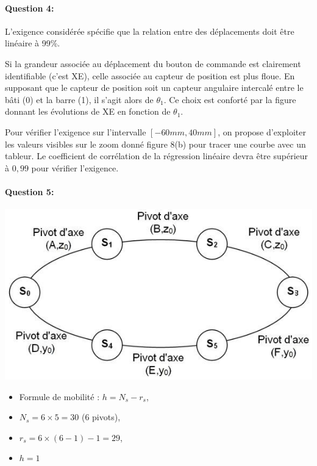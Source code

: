 \paragraph{Question 4:} L'exigence considérée spécifie que la relation entre des déplacements doit être linéaire à 99\%.

Si la grandeur associée au déplacement du bouton de commande est clairement identifiable (c'est XE), celle associée au capteur de position est plus floue. En supposant que le capteur de position soit un capteur angulaire intercalé entre le bâti (0) et la barre (1), il s'agit alors de $\theta_1$. Ce choix est conforté par la figure donnant les évolutions de XE en fonction de $\theta_1$.

Pour vérifier l'exigence sur l'intervalle $[-60 mm, 40 mm]$, on propose d'exploiter les valeurs visibles sur le zoom donné figure 8(b) pour tracer une courbe avec un tableur. Le coefficient de corrélation de la régression linéaire devra être supérieur à $0,99$ pour vérifier l'exigence.

\paragraph{Question 5:}

\begin{minipage}{0.45\linewidth}
	\includegraphics[width=0.9\linewidth]{img/liaisons}
\end{minipage}\hfill
\begin{minipage}{0.45\linewidth}
\begin{itemize}
 \item Formule de mobilité : $h = N_s-r_s$,
 \item $N_s = 6\times 5=30$ (6 pivots),
 \item $r_s = 6\times (6-1)-1 = 29$,
 \item $h = 1$
\end{itemize}
\end{minipage}

